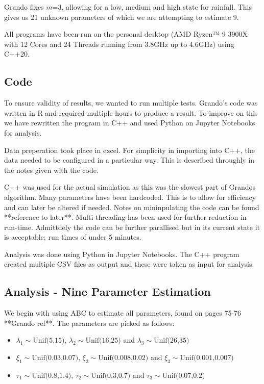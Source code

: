 Grando fixes $m$=3, allowing for a low, medium and high state for rainfall. This gives us 21 unknown parameters of which we are attempting to estimate 9.

All programs have been run on the personal desktop (AMD Ryzen™ 9 3900X with 12 Cores and 24 Threads running from 3.8GHz up to 4.6GHz) using C++20.

\subsection{Code}

To ensure validity of results, we wanted to run multiple tests. Grando's code was written in R and required multiple hours to produce a result. To improve on this we have rewritten the program in C++ and used Python on Jupyter Notebooks for analysis.

Data preperation took place in excel. For simplicity in importing into C++, the data needed to be configured in a particular way. This is described throughly in the notes given with the code. 

C++ was used for the actual simulation as this was the slowest part of Grandos algorithm. Many parameters have been hardcoded. This is to allow for efficiency and can later be altered if needed. Notes on mininpulating the code can be found **reference to later**. Multi-threading has been used for further reduction in run-time. Admittdely the code can be further parallised but in its current state it is acceptable; run times of under 5 minutes. 

Analysis was done using Python in Jupyter Notebooks. The C++ program created multiple CSV files as output and these were taken as input for analysis. 

\subsection{Analysis - Nine Parameter Estimation}

We begin with using ABC to estimate all parameters, found on pages 75-76 **Grando ref**. The parameters are picked as follows:

\begin{itemize}
    \item $\lambda_1 \sim \text{Unif(5,15)}$, $\lambda_2 \sim \text{Unif(16,25)}$ and $\lambda_3 \sim \text{Unif(26,35)}$
    \item $\xi_1 \sim \text{Unif(0.03,0.07)}$, $\xi_2 \sim \text{Unif(0.008,0.02)}$ and $\xi_3 \sim \text{Unif(0.001,0.007)}$
    \item $\tau_1 \sim \text{Unif(0.8,1.4)}$, $\tau_2 \sim \text{Unif(0.3,0.7)}$ and $\tau_3 \sim \text{Unif(0.07,0.2)}$
\end{itemize}

